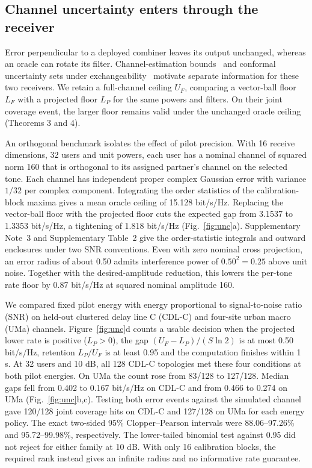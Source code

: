 \documentclass[lineno,pdflatex,sn-nature]{sn-jnl}
\begin{document}
\subsection*{Channel uncertainty enters through the receiver}
Error perpendicular to a deployed combiner leaves its output unchanged, whereas an oracle can rotate its filter. Channel-estimation bounds~\cite{hejazipilot} and conformal uncertainty sets under exchangeability~\cite{lei,johnstone} motivate separate information for these two receivers. We retain a full-channel ceiling \(U_F\), comparing a vector-ball floor \(L_F\) with a projected floor \(L_P\) for the same powers and filters. On their joint coverage event, the larger floor remains valid under the unchanged oracle ceiling (Theorems 3 and 4).

An orthogonal benchmark isolates the effect of pilot precision. With 16 receive dimensions, 32 users and unit powers, each user has a nominal channel of squared norm 160 that is orthogonal to its assigned partner's channel on the selected tone. Each channel has independent proper complex Gaussian error with variance \(1/32\) per complex component. Integrating the order statistics of the calibration-block maxima gives a mean oracle ceiling of 15.128 bit/s/Hz. Replacing the vector-ball floor with the projected floor cuts the expected gap from 3.1537 to 1.3353 bit/s/Hz, a tightening of 1.818 bit/s/Hz (Fig.~\ref{fig:unc}a). Supplementary Note~3 and Supplementary Table~2 give the order-statistic integrals and outward enclosures under two SNR conventions. Even with zero nominal cross projection, an error radius of about 0.50 admits interference power of \(0.50^2=0.25\) above unit noise. Together with the desired-amplitude reduction, this lowers the per-tone rate floor by 0.87 bit/s/Hz at squared nominal amplitude 160.


We compared fixed pilot energy with energy proportional to signal-to-noise ratio (SNR) on held-out clustered delay line C (CDL-C) and four-site urban macro (UMa) channels. Figure~\ref{fig:unc}d counts a usable decision when the projected lower rate is positive (\(L_P>0\)), the gap \((U_F-L_P)/(S\ln2)\) is at most 0.50 bit/s/Hz, retention \(L_P/U_F\) is at least 0.95 and the computation finishes within 1 s. At 32 users and 10 dB, all 128 CDL-C topologies met these four conditions at both pilot energies. On UMa the count rose from 83/128 to 127/128. Median gaps fell from 0.402 to 0.167 bit/s/Hz on CDL-C and from 0.466 to 0.274 on UMa (Fig.~\ref{fig:unc}b,c). Testing both error events against the simulated channel gave 120/128 joint coverage hits on CDL-C and 127/128 on UMa for each energy policy. The exact two-sided 95\% Clopper--Pearson intervals were 88.06--97.26\% and 95.72--99.98\%, respectively. The lower-tailed binomial test against 0.95 did not reject for either family at 10 dB. With only 16 calibration blocks, the required rank instead gives an infinite radius and no informative rate guarantee.
\end{document}
